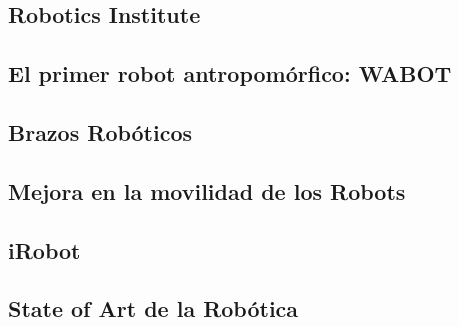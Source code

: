 \documentclass[a4paper,11pt]{article}
\begin{document}
\subsection{Robotics Institute}


\subsection{El primer robot antropomórfico: WABOT}


\subsection{Brazos Robóticos}


\subsection{Mejora en la movilidad de los Robots}


\subsection{iRobot}


\subsection{State of Art de la Robótica}


\normalsize


\onecolumn


\nocite{*}
\end{document}
